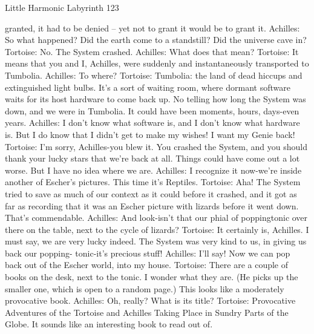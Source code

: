 Little Harmonic Labyrinth                                                             123

                    granted, it had to be denied – yet not to grant it would be to grant
                    it.
               Achilles: So what happened? Did the earth come to a standstill? Did the
                      universe cave in?
               Tortoise: No. The System crashed. Achilles: What does that mean?
               Tortoise: It means that you and I, Achilles, were suddenly and
                      instantaneously transported to Tumbolia. Achilles: To where?
               Tortoise: Tumbolia: the land of dead hiccups and extinguished light
                      bulbs. It's a sort of waiting room, where dormant software waits
                      for its host hardware to come back up. No telling how long the
                      System was down, and we were in Tumbolia. It could have been
                      moments, hours, days-even years.
               Achilles: I don't know what software is, and I don't know what hardware
                      is. But I do know that I didn't get to make my wishes! I want my
                      Genie back!
               Tortoise: I'm sorry, Achilles-you blew it. You crashed the System, and
                      you should thank your lucky stars that we're back at all. Things
                      could have come out a lot worse. But I have no idea where we
                      are.
               Achilles: I recognize it now-we're inside another of Escher's pictures.
                      This time it's Reptiles.
               Tortoise: Aha! The System tried to save as much of our context as it
                      could before it crashed, and it got as far as recording that it was
                      an Escher picture with lizards before it went down. That's
                      commendable.
               Achilles: And look-isn't that our phial of poppingtonic over there on the
                      table, next to the cycle of lizards?
               Tortoise: It certainly is, Achilles. I must say, we are very lucky indeed.
                      The System was very kind to us, in giving us back our popping-
                      tonic-it's precious stuff!
               Achilles: I'll say! Now we can pop back out of the Escher world, into my
                      house.
               Tortoise: There are a couple of books on the desk, next to the tonic. I
                      wonder what they are. (He picks up the smaller one, which is
                      open to a random page.) This looks like a moderately
                      provocative book.
               Achilles: Oh, really? What is its title?
               Tortoise: Provocative Adventures of the Tortoise and Achilles Taking
                      Place in Sundry Parts of the Globe. It sounds like an interesting
                      book to read out of.




